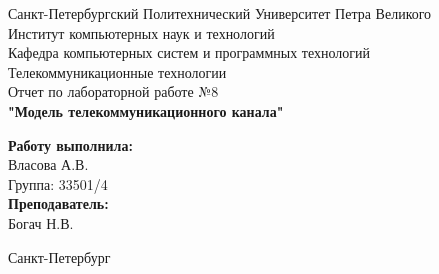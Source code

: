 \documentclass[a4paper]{article}
\begin{document}

\begin{titlepage}	%

	\begin{center}		%

		\large Санкт-Петербургский Политехнический Университет Петра Великого\\
		\large Институт компьютерных наук и технологий \\
		\large Кафедра компьютерных систем и программных технологий\\[6cm]
		
		\huge Телекоммуникационные технологии\\[0.5cm] %
		\large Отчет по лабораторной работе №8 \\[0.2cm]
		\large\textbf{"Модель телекоммуникационного канала"}\\[5cm]

	\end{center}


	\begin{flushright} %
		\begin{minipage}{0.25\textwidth} %
			\begin{flushleft} %

				\large\textbf{Работу выполнила:}\\
				\large Власова А.В.\\
				\large {Группа:} 33501/4\\
				
				\large \textbf{Преподаватель:}\\
				\large Богач Н.В.\

			\end{flushleft}
		\end{minipage}
	\end{flushright}
	
	\vfill %

	\begin{center}
	\large Санкт-Петербург\\
	\large \the\year %
	\end{center} %

\thispagestyle{empty} %
\end{titlepage} %
\end{document}
